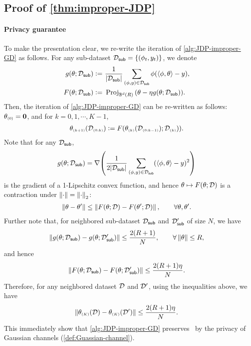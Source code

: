
\subsection{Proof of \cref{thm:improper-JDP}}\label{appdx:improper-JDP}

\newcommand{\cDsub}{\cD_{\mathsf{sub}}}

\paragraph{Privacy guarantee}
To make the presentation clear, we re-write the iteration of \cref{alg:JDP-improper-GD} as follows. For any sub-dataset $\cDsub=\sset{(\x_{t},y_{t})}$, we denote
\begin{align*}
    g(\theta;\cDsub)\defeq&~ \frac1{|\cDsub|} \sum_{(\x,y)\in\cDsub}\x\paren{ \lr \x, \theta\rr-y }, \\
    F(\theta;\cDsub)\defeq&~ \Proj_{\BR}\paren{ \theta-\eta g(\theta;\cDsub) }.
\end{align*}
Then, the iteration of \cref{alg:JDP-improper-GD} can be re-written as follows:
$\theta_{\scriptscriptstyle{ (0) }}=\mathbf{0}$, and for $k=0,1,\cdots,K-1$, 
\begin{align*}
    \theta_{\scriptscriptstyle{ (k+1) }}(\mathcal{D}_{\scriptscriptstyle{ (0:k) }})\mathrel{\mathop:}= F{\left( \theta _{\scriptscriptstyle{ (k) }}(\mathcal{D}_{\scriptscriptstyle{ (0:k-1) }});\mathcal{D}_{\scriptscriptstyle{ (k) }}) \right)}.
\end{align*}
Note that for any $\cDsub$,
\begin{align*}
    g(\theta;\cDsub)=\nabla \paren{ \frac{1}{2|\cDsub|}\sum_{(\x,y)\in\cDsub} (\lr \x,\theta\rr-y)^2 }
\end{align*}
is the gradient of a 1-Lipschitz convex function, and hence $\theta\mapsto F(\theta;\mathcal{D})$ is a contraction under $\left\|\cdot\right\|=\left\|\cdot\right\|_2$:
\begin{align*}
    \left\|\theta-\theta'\right\|\leq \left\|F(\theta;\mathcal{D})-F(\theta';\mathcal{D})\right\|, \qquad \forall \theta,\theta'.
\end{align*}
Further note that, for neighbored sub-dataset $\cDsub$ and $\cDsub'$ of size $N$, we have
\begin{align*}
    \nrm{g(\theta;\cDsub)-g(\theta;\cDsub')}\leq \frac{2(R+1)}{N}, \qquad \forall \nrm{\theta}\leq R,
\end{align*}
and hence 
\begin{align*}
    \nrm{F(\theta;\cDsub)-F(\theta;\cDsub')}\leq \frac{2(R+1)\eta}{N}.
\end{align*}
Therefore, for any neighbored dataset $\mathcal{D}$ and $\mathcal{D}'$, using the inequalities above, we have
\begin{align*}
    \left\|\theta_{\scriptscriptstyle{ (K) }}(\mathcal{D})-\theta_{\scriptscriptstyle{ (K) }}(\mathcal{D}')\right\|\leq \frac{2(R+1)\eta}{N}.
\end{align*}
This immediately show that \cref{alg:JDP-improper-GD} preserves \aJDP~by the privacy of Gaussian channels (\cref{def:Guassian-channel}).


